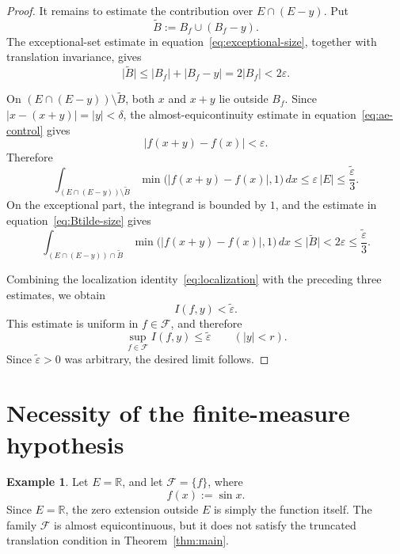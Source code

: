 \documentclass[11pt]{article}
\theoremstyle{plain}
\theoremstyle{definition}
\newtheorem{example}{Example}
\theoremstyle{remark}
\newcommand{\R}{\mathbb{R}}
\newcommand{\F}{\mathcal{F}}
\newcommand{\eps}{\varepsilon}
\newcommand{\meas}[1]{\lvert #1\rvert}
\begin{document}
\begin{proof}
It remains to estimate the contribution over $E\cap(E-y)$. Put
\[
    \widetilde B:=B_f\cup(B_f-y).
\]
The exceptional-set estimate in equation~\eqref{eq:exceptional-size}, together
with translation invariance, gives
\begin{equation}\label{eq:Btilde-size}
    \meas{\widetilde B}
    \le \meas{B_f}+\meas{B_f-y}
    =2\meas{B_f}
    <2\eps .
\end{equation}

On $(E\cap(E-y))\setminus\widetilde B$, both $x$ and $x+y$ lie outside
$B_f$. Since $|x-(x+y)|=|y|<\delta$, the almost-equicontinuity estimate in
equation~\eqref{eq:ae-control} gives
\[
    |f(x+y)-f(x)|<\eps .
\]
Therefore
\begin{equation}\label{eq:regular-part}
    \int_{(E\cap(E-y))\setminus\widetilde B}
    \min\bigl(|f(x+y)-f(x)|,1\bigr)\,dx
    \le \eps\,\meas{E}
    \le \frac{\widetilde\eps}{3}.
\end{equation}
On the exceptional part, the integrand is bounded by $1$, and the estimate in
equation~\eqref{eq:Btilde-size} gives
\begin{equation}\label{eq:exceptional-part}
    \int_{(E\cap(E-y))\cap\widetilde B}
    \min\bigl(|f(x+y)-f(x)|,1\bigr)\,dx
    \le \meas{\widetilde B}
    <2\eps
    \le \frac{\widetilde\eps}{3}.
\end{equation}

Combining the localization identity~\eqref{eq:localization} with the preceding
three estimates, we obtain
\[
    I(f,y)<\widetilde\eps .
\]
This estimate is uniform in $f\in\F$, and therefore
\[
    \sup_{f\in\F}I(f,y)\le \widetilde\eps
    \qquad (|y|<r).
\]
Since $\widetilde\eps>0$ was arbitrary, the desired limit follows.
\end{proof}

\section{Necessity of the finite-measure hypothesis}

\begin{example}\label{ex:sin}
Let $E=\R$, and let $\F=\{f\}$, where
\[
    f(x):=\sin x .
\]
Since $E=\R$, the zero extension outside $E$ is simply the function itself.
The family $\F$ is almost equicontinuous, but it does not satisfy the
truncated translation condition in Theorem~\ref{thm:main}.
\end{example}
\end{document}
